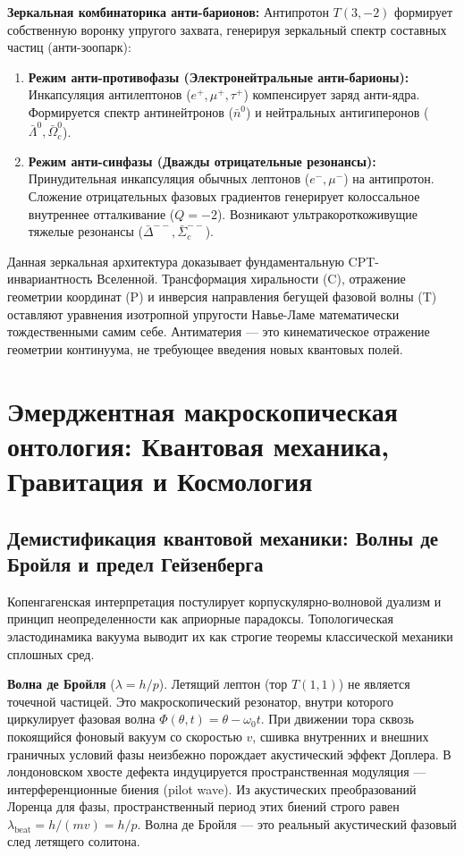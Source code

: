 \documentclass[12pt,a4paper]{article}
\begin{document}
\textbf{Зеркальная комбинаторика анти-барионов:}
Антипротон $T(3,-2)$ формирует собственную воронку упругого захвата, генерируя зеркальный спектр составных частиц (анти-зоопарк):
\begin{enumerate}
    \item \textbf{Режим анти-противофазы (Электронейтральные анти-барионы):} Инкапсуляция антилептонов ($e^+, \mu^+, \tau^+$) компенсирует заряд анти-ядра. Формируется спектр антинейтронов ($\bar{n}^0$) и нейтральных антигиперонов ($\bar{\Lambda}^0, \bar{\Omega}_c^0$).
    \item \textbf{Режим анти-синфазы (Дважды отрицательные резонансы):} Принудительная инкапсуляция обычных лептонов ($e^-, \mu^-$) на антипротон. Сложение отрицательных фазовых градиентов генерирует колоссальное внутреннее отталкивание ($Q=-2$). Возникают ультракороткоживущие тяжелые резонансы ($\bar{\Delta}^{--}, \bar{\Sigma}_c^{--}$).
\end{enumerate}

Данная зеркальная архитектура доказывает фундаментальную CPT-инвариантность Вселенной. Трансформация хиральности (C), отражение геометрии координат (P) и инверсия направления бегущей фазовой волны (T) оставляют уравнения изотропной упругости Навье-Ламе математически тождественными самим себе. Антиматерия — это кинематическое отражение геометрии континуума, не требующее введения новых квантовых полей.

\section{Эмерджентная макроскопическая онтология: Квантовая механика, Гравитация и Космология}

\subsection{Демистификация квантовой механики: Волны де Бройля и предел Гейзенберга}
Копенгагенская интерпретация постулирует корпускулярно-волновой дуализм и принцип неопределенности как априорные парадоксы. Топологическая эластодинамика вакуума выводит их как строгие теоремы классической механики сплошных сред.

\textbf{Волна де Бройля} ($\lambda = h/p$). Летящий лептон (тор $T(1,1)$) не является точечной частицей. Это макроскопический резонатор, внутри которого циркулирует фазовая волна $\Phi(\theta, t) = \theta - \omega_0 t$. При движении тора сквозь покоящийся фоновый вакуум со скоростью $v$, сшивка внутренних и внешних граничных условий фазы неизбежно порождает акустический эффект Доплера. В лондоновском хвосте дефекта индуцируется пространственная модуляция — интерференционные биения (pilot wave). Из акустических преобразований Лоренца для фазы, пространственный период этих биений строго равен $\lambda_{\text{beat}} = h / (mv) = h/p$. Волна де Бройля — это реальный акустический фазовый след летящего солитона.
\end{document}
